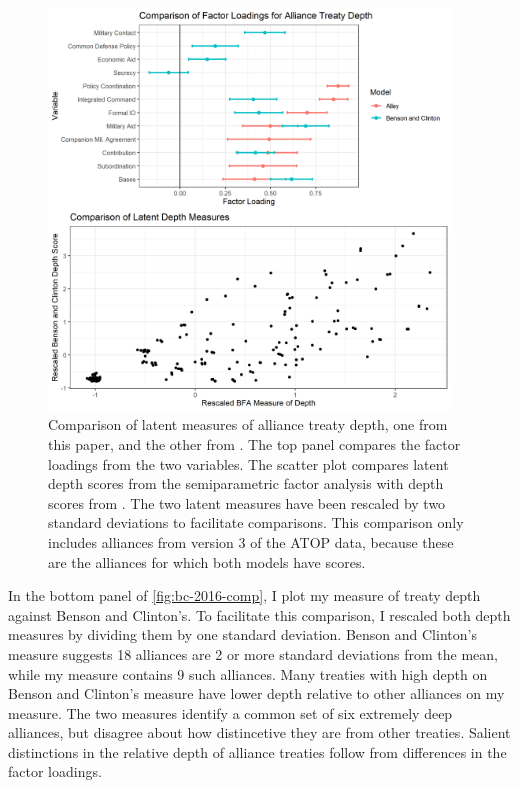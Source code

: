 \documentclass[12pt]{article}
\begin{document}
\begin{figure}[htbp]
	\centering
		\includegraphics[width=0.95\textwidth]{bc-2016-comp.png}
	\caption{Comparison of latent measures of alliance treaty depth, one from this paper, and the other from \citet{BensonClinton2016}. The top panel compares the factor loadings from the two variables. The scatter plot compares latent depth scores from the semiparametric factor analysis with depth scores from \citet{BensonClinton2016}. The two latent measures have been rescaled by two standard deviations to facilitate comparisons. This comparison only includes alliances from version 3 of the ATOP data, because these are the alliances for which both models have scores.}
	\label{fig:bc-2016-comp}
\end{figure}


In the bottom panel of \autoref{fig:bc-2016-comp}, I plot my measure of treaty depth against Benson and Clinton's. 
To facilitate this comparison, I rescaled both depth measures by dividing them by one standard deviation.
Benson and Clinton's measure suggests 18 alliances are 2 or more standard deviations from the mean, while my measure contains 9 such alliances. 
Many treaties with high depth on Benson and Clinton's measure have lower depth relative to other alliances on my measure.
The two measures identify a common set of six extremely deep alliances, but disagree about how distincetive they are from other treaties. 
Salient distinctions in the relative depth of alliance treaties follow from differences in the factor loadings. 
\end{document}

